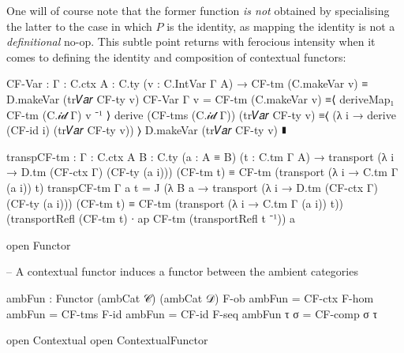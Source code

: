 One will of course note that the former function \emph{is not} obtained by
specialising the latter to the case in which $P$ is the identity, as mapping the
identity is not a \emph{definitional} no-op. This subtle point returns with
ferocious intensity when it comes to defining the identity and composition of
contextual functors:

\begin{code}[hide]
  CF-Var : {Γ : C.ctx} {A : C.ty} (v : C.IntVar Γ A) →
    CF-tm (C.makeVar v) ≡ D.makeVar (tr𝑉𝑎𝑟 CF-ty v)
  CF-Var {Γ} v =
    CF-tm (C.makeVar v)
      ≡⟨ deriveMap₁ CF-tm (C.𝒾𝒹 Γ) v ⁻¹ ⟩
    derive (CF-tms (C.𝒾𝒹 Γ)) (tr𝑉𝑎𝑟 CF-ty v)
      ≡⟨ (λ i → derive (CF-id i) (tr𝑉𝑎𝑟 CF-ty v)) ⟩
    D.makeVar (tr𝑉𝑎𝑟 CF-ty v)
      ∎

  transpCF-tm : {Γ : C.ctx} {A B : C.ty} (a : A ≡ B) (t : C.tm Γ A) →
    transport (λ i → D.tm (CF-ctx Γ) (CF-ty (a i))) (CF-tm t)
      ≡ CF-tm (transport (λ i → C.tm Γ (a i)) t)
  transpCF-tm {Γ} a t =
    J (λ B a → transport (λ i → D.tm (CF-ctx Γ) (CF-ty (a i))) (CF-tm t)
      ≡ CF-tm (transport (λ i → C.tm Γ (a i)) t))
      (transportRefl (CF-tm t) ∙ ap CF-tm (transportRefl t ⁻¹)) a

  open Functor

  -- A contextual functor induces a functor between the ambient categories

  ambFun : Functor (ambCat 𝒞) (ambCat 𝒟)
  F-ob ambFun = CF-ctx
  F-hom ambFun = CF-tms
  F-id ambFun = CF-id
  F-seq ambFun τ σ = CF-comp σ τ

open Contextual
open ContextualFunctor
\end{code}

